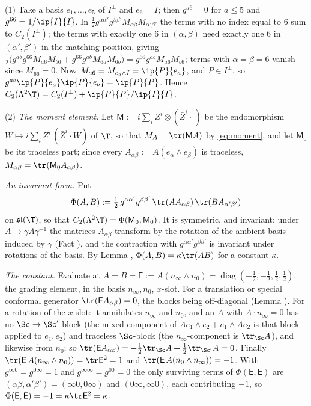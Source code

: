 (1) Take a basis $e_{1}, \dots, e_{5}$ of $I^{\perp}$ and $e_{6} = I$; then $g^{a6} = 0$ for $a \le 5$ and $g^{66} = 1/\ip{I}{I}$. In $\tfrac12 g^{\alpha\alpha'}g^{\beta\beta'}M_{\alpha\beta}M_{\alpha'\beta'}$ the terms with no index equal to $6$ sum to $C_{2}(I^{\perp})$; the terms with exactly one $6$ in $(\alpha,\beta)$ need exactly one $6$ in $(\alpha',\beta')$ in the matching position, giving $\tfrac12\bigl(g^{ab}g^{66}M_{a6}M_{b6} + g^{66}g^{ab}M_{6a}M_{6b}\bigr) = g^{66}g^{ab}M_{a6}M_{b6}$; terms with $\alpha = \beta = 6$ vanish since $M_{66} = 0$. Now $M_{a6} = M_{e_{a}\wedge I} = \ip{P}{e_{a}}$, and $P \in I^{\perp}$, so $g^{ab}\ip{P}{e_{a}}\ip{P}{e_{b}} = \ip{P}{P}$. Hence $C_{2}(\Lambda^{2}\T) = C_{2}(I^{\perp}) + \ip{P}{P}/\ip{I}{I}$.

(2) \emph{The moment element.} Let $\mathsf{M} := i\sum_{i}Z^{i}\otimes(\bar{Z}^{i}\cdot\,)$ be the endomorphism $W \mapsto i\sum_{i}Z^{i}\,(\bar{Z}^{i}\cdot W)$ of $\T$, so that $M_{A} = \tr(\mathsf{M}A)$ by \eqref{eq:moment}, and let $\mathsf{M}_{0}$ be its traceless part; since every $A_{\alpha\beta} := A(e_{\alpha}\wedge e_{\beta})$ is traceless, $M_{\alpha\beta} = \tr(\mathsf{M}_{0}A_{\alpha\beta})$.

\emph{An invariant form.} Put
\[
\Phi(A, B) := \tfrac12\, g^{\alpha\alpha'}g^{\beta\beta'}\,\tr(AA_{\alpha\beta})\,\tr(BA_{\alpha'\beta'})
\]
on $\mathfrak{sl}(\T)$, so that $C_{2}(\Lambda^{2}\T) = \Phi(\mathsf{M}_{0}, \mathsf{M}_{0})$. It is symmetric, and invariant: under $A \mapsto \gamma A\gamma^{-1}$ the matrices $A_{\alpha\beta}$ transform by the rotation of the ambient basis induced by $\gamma$ (Fact ), and the contraction with $g^{\alpha\alpha'}g^{\beta\beta'}$ is invariant under rotations of the basis. By Lemma , $\Phi(A,B) = \kappa\tr(AB)$ for a constant $\kappa$.

\emph{The constant.} Evaluate at $A = B = \mathsf{E} := A(n_{\infty}\wedge n_{0}) = \operatorname{diag}(-\tfrac12,-\tfrac12,\tfrac12,\tfrac12)$, the grading element, in the basis $n_{\infty}, n_{0}$, $x$-slot. For a translation or special conformal generator $\tr(\mathsf{E}A_{\alpha\beta}) = 0$, the blocks being off-diagonal (Lemma ). For a rotation of the $x$-slot: it annihilates $n_{\infty}$ and $n_{0}$, and an $A$ with $A\cdot n_{\infty} = 0$ has no $\Sc \to \Sc'$ block (the mixed component of $Ae_{1}\wedge e_{2} + e_{1}\wedge Ae_{2}$ is that block applied to $e_{1}, e_{2}$) and traceless $\Sc$-block (the $n_{\infty}$-component is $\tr_{\Sc}A$), and likewise from $n_{0}$; so $\tr(\mathsf{E}A_{\alpha\beta}) = -\tfrac12\tr_{\Sc}A + \tfrac12\tr_{\Sc'}A = 0$. Finally $\tr(\mathsf{E}\,A(n_{\infty}\wedge n_{0})) = \tr \mathsf{E}^{2} = 1$ and $\tr(\mathsf{E}\,A(n_{0}\wedge n_{\infty})) = -1$. With $g^{\infty 0} = g^{0\infty} = 1$ and $g^{\infty\infty} = g^{00} = 0$ the only surviving terms of $\Phi(\mathsf{E},\mathsf{E})$ are $(\alpha\beta, \alpha'\beta') = (\infty 0, 0\infty)$ and $(0\infty, \infty 0)$, each contributing $-1$, so $\Phi(\mathsf{E},\mathsf{E}) = -1 = \kappa\tr \mathsf{E}^{2} = \kappa$.

